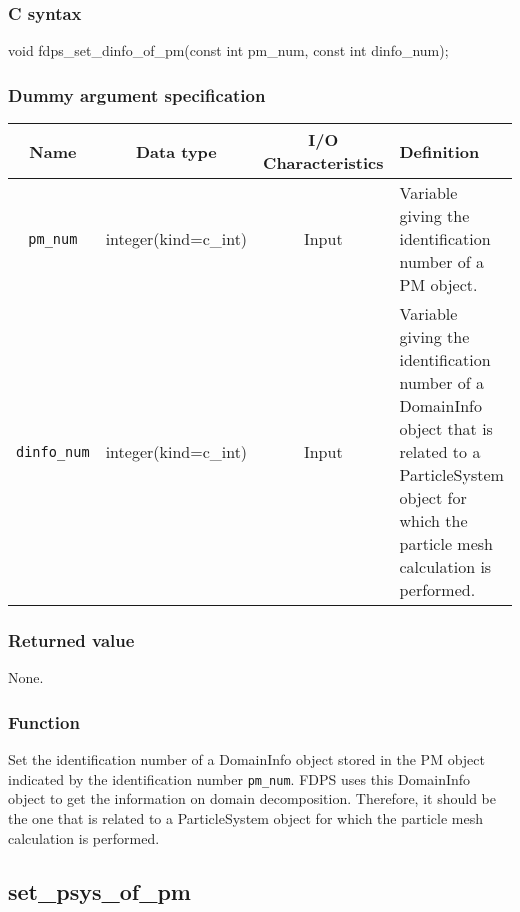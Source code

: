 \subsubsection*{C syntax}
\begin{screen}
\begin{spverbatim}
void fdps_set_dinfo_of_pm(const int pm_num,
                          const int dinfo_num);
\end{spverbatim}
\end{screen}

\subsubsection*{Dummy argument specification}
\begin{table}[h]
\begin{tabularx}{\linewidth}{cccX}
\toprule
\rowcolor{Snow2}
Name & Data type & I/O Characteristics & Definition \\
\midrule
\texttt{pm\_num} & integer(kind=c\_int) & Input & Variable giving the identification number of a PM object.\\
\texttt{dinfo\_num} & integer(kind=c\_int) & Input & Variable giving the identification number of a DomainInfo object that is related to a ParticleSystem object for which the particle mesh calculation is performed.\\
\bottomrule
\end{tabularx}
\end{table}


\subsubsection*{Returned value}
None.

\subsubsection*{Function}
Set the identification number of a DomainInfo object stored in the PM object indicated by the identification number \texttt{pm\_num}. FDPS uses this DomainInfo object to get the information on domain decomposition. Therefore, it should be the one that is related to a ParticleSystem object for which the particle mesh calculation is performed.
\clearpage

\subsection{set\_psys\_of\_pm}
